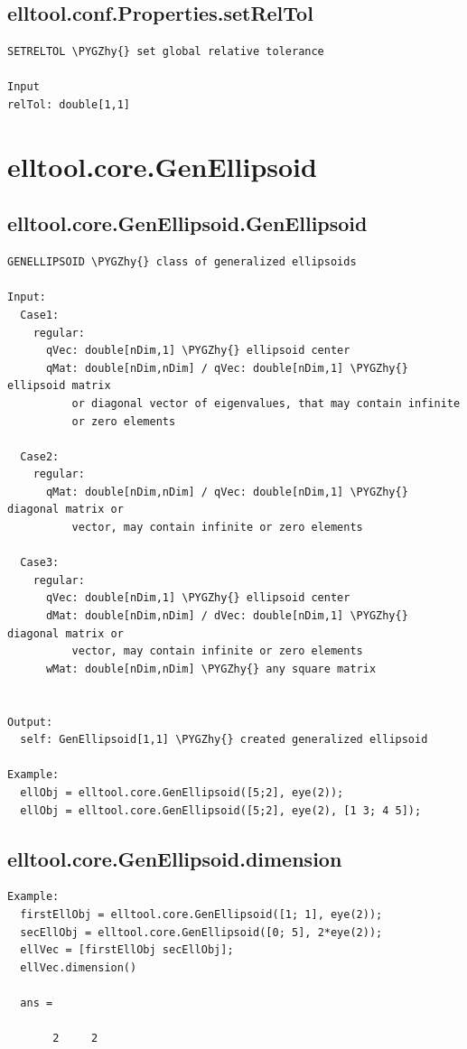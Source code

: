 \documentclass[letterpaper,10pt,english]{sphinxmanual}
\def\PYGZhy{\char`\-}
\begin{document}
\subsection{elltool.conf.Properties.setRelTol}
\label{chap_functions:elltool-conf-properties-setreltol}
\begin{Verbatim}[commandchars=\\\{\}]
SETRELTOL \PYGZhy{} set global relative tolerance

Input
relTol: double[1,1]
\end{Verbatim}


\section{elltool.core.GenEllipsoid}
\label{chap_functions:elltool-core-genellipsoid}

\subsection{elltool.core.GenEllipsoid.GenEllipsoid}
\label{chap_functions:elltool-core-genellipsoid-genellipsoid}
\begin{Verbatim}[commandchars=\\\{\}]
GENELLIPSOID \PYGZhy{} class of generalized ellipsoids

Input:
  Case1:
    regular:
      qVec: double[nDim,1] \PYGZhy{} ellipsoid center
      qMat: double[nDim,nDim] / qVec: double[nDim,1] \PYGZhy{} ellipsoid matrix
          or diagonal vector of eigenvalues, that may contain infinite
          or zero elements

  Case2:
    regular:
      qMat: double[nDim,nDim] / qVec: double[nDim,1] \PYGZhy{} diagonal matrix or
          vector, may contain infinite or zero elements

  Case3:
    regular:
      qVec: double[nDim,1] \PYGZhy{} ellipsoid center
      dMat: double[nDim,nDim] / dVec: double[nDim,1] \PYGZhy{} diagonal matrix or
          vector, may contain infinite or zero elements
      wMat: double[nDim,nDim] \PYGZhy{} any square matrix


Output:
  self: GenEllipsoid[1,1] \PYGZhy{} created generalized ellipsoid

Example:
  ellObj = elltool.core.GenEllipsoid([5;2], eye(2));
  ellObj = elltool.core.GenEllipsoid([5;2], eye(2), [1 3; 4 5]);
\end{Verbatim}


\subsection{elltool.core.GenEllipsoid.dimension}
\label{chap_functions:elltool-core-genellipsoid-dimension}
\begin{Verbatim}[commandchars=\\\{\}]
Example:
  firstEllObj = elltool.core.GenEllipsoid([1; 1], eye(2));
  secEllObj = elltool.core.GenEllipsoid([0; 5], 2*eye(2));
  ellVec = [firstEllObj secEllObj];
  ellVec.dimension()

  ans =

       2     2
\end{Verbatim}
\end{document}
